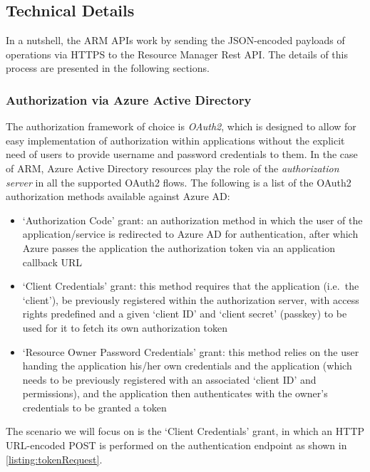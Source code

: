 \documentclass[11pt]{report}
\begin{document}
\subsection{Technical Details}

In a nutshell, the ARM APIs work by sending the JSON-encoded payloads of
operations via HTTPS to the Resource Manager Rest API. The details
of this process are presented in the following sections.

\subsubsection{Authorization via Azure Active Directory}

The authorization framework of choice is \textit{OAuth2}, which is designed to
allow for easy implementation of authorization within applications without the
explicit need of users to provide username and password credentials to them. In
the case of ARM, Azure Active Directory resources play the role of the
\textit{authorization server} in all the supported OAuth2 flows. \newline
The following is a list of the OAuth2 authorization methods available against Azure AD:

\begin{itemize}
    \item{`Authorization Code' grant:} an authorization method in which the user
        of the application/service is redirected to Azure AD for
        authentication, after which Azure passes the application the
        authorization token via an application callback URL
    \item{`Client Credentials' grant:} this method requires that the application
        (i.e.\ the `client'), be previously registered within the authorization
        server, with access rights predefined and a given `client ID' and
        `client secret' (passkey) to be used for it to fetch its own
        authorization token
    \item{`Resource Owner Password Credentials' grant:} this method relies on
        the user handing the application his/her own credentials and the
        application (which needs to be previously registered with an associated
        `client ID' and permissions), and the application then authenticates
        with the owner's credentials to be granted a token
\end{itemize}

The scenario we will focus on is the `Client Credentials' grant, in which an
HTTP URL-encoded POST is performed on the authentication endpoint as shown
in \autoref{listing:tokenRequest}. \newpage
\end{document}

